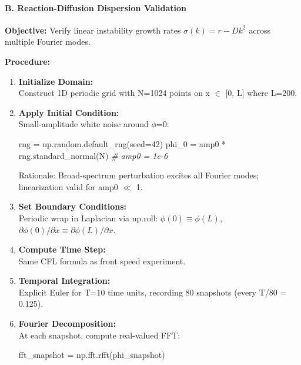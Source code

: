 \documentclass[
]{article}
\newenvironment{Shaded}{}{}
\newcommand{\CommentTok}[1]{\textcolor[rgb]{0.38,0.63,0.69}{\textit{#1}}}
\newcommand{\DecValTok}[1]{\textcolor[rgb]{0.25,0.63,0.44}{#1}}
\newcommand{\NormalTok}[1]{#1}
\newcommand{\OperatorTok}[1]{\textcolor[rgb]{0.40,0.40,0.40}{#1}}
\begin{document}
\hypertarget{b.-reaction-diffusion-dispersion-validation}{%
\paragraph{B. Reaction-Diffusion Dispersion
Validation}\label{b.-reaction-diffusion-dispersion-validation}}

\textbf{Objective:} Verify linear instability growth rates
\(\sigma(k) = r - D k^{2}\) across multiple Fourier modes.

\textbf{Procedure:}

\begin{enumerate}
\def\labelenumi{\arabic{enumi}.}
\item
  \textbf{Initialize Domain:}\\
  Construct 1D periodic grid with N=1024 points on x $\in$ {[}0, L{]} where
  L=200.
\item
  \textbf{Apply Initial Condition:}\\
  Small-amplitude white noise around $\phi$=0:

\begin{Shaded}
\begin{Highlighting}[]
\NormalTok{rng }\OperatorTok{=}\NormalTok{ np.random.default\_rng(seed}\OperatorTok{=}\DecValTok{42}\NormalTok{)}
\NormalTok{phi\_0 }\OperatorTok{=}\NormalTok{ amp0 }\OperatorTok{*}\NormalTok{ rng.standard\_normal(N)  }\CommentTok{\# amp0 = 1e{-}6}
\end{Highlighting}
\end{Shaded}

  Rationale: Broad-spectrum perturbation excites all Fourier modes;
  linearization valid for amp0 $\ll$ 1.
\item
  \textbf{Set Boundary Conditions:}\\
  Periodic wrap in Laplacian via np.roll: \(\phi(0) \equiv \phi(L)\),
  \(\partial\phi(0)/\partial x \equiv \partial\phi(L)/\partial x\).
\item
  \textbf{Compute Time Step:}\\
  Same CFL formula as front speed experiment.
\item
  \textbf{Temporal Integration:}\\
  Explicit Euler for T=10 time units, recording 80 snapshots (every T/80
  = 0.125).
\item
  \textbf{Fourier Decomposition:}\\
  At each snapshot, compute real-valued FFT:

\begin{Shaded}
\begin{Highlighting}[]
\NormalTok{fft\_snapshot }\OperatorTok{=}\NormalTok{ np.fft.rfft(phi\_snapshot)}
\end{Highlighting}
\end{Shaded}


\end{enumerate}
\end{document}

